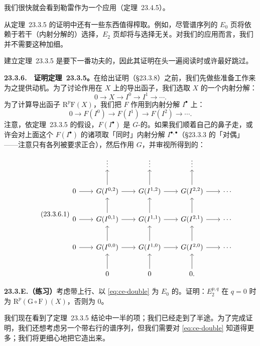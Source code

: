 我们很快就会看到勒雷\trSpectralSequence{}作为一个应用（\mbox{定理~23.4.5}）。

从\mbox{定理~23.3.5} 的证明中还有一些东西值得榨取。例如，尽管谱序列的 $E_0$ 页将依赖于若干（内射分解的）选择，$E_2$ 页却将与选择无关。对我们的应用而言，我们并不需要这种加细。

建立\mbox{定理~23.3.5} 是要下一番功夫的，因此其证明在头一遍阅读时或许最好跳过。

\textbf{23.3.6.}\ \hard\ \textbf{证明\mbox{定理~23.3.5}。}\quad 在给出证明（\S23.3.8）之前，我们先做些准备工作来为之提供动机。为了讨论作用在 $X$ 上的导出函子，我们选取 $X$ 的一个内射分解：
\[
0 \longrightarrow X \longrightarrow I^0 \longrightarrow I^1 \longrightarrow \cdots.
\]
为了计算导出函子 $\mathrm{R}^p\mathrm{F}(X)$，我们把 $F$ 作用到内射分解 $I^\bullet$ 上：
\[
0 \longrightarrow F(I^0) \longrightarrow F(I^1) \longrightarrow F(I^2) \longrightarrow \cdots.
\]
注意，依\mbox{定理~23.3.5} 的假设，$F(I^\bullet)$ 是 $G$-\trAcyclic{}的。如果我们顺着自己的鼻子走，或许会对上面这个\trComplexN{} $F(I^\bullet)$ 的诸项取「同时」内射分解 $I^{\bullet,\bullet}$（\S23.3.3 的「对偶」——注意只有各列被要求正合），然后作用 $G$，并审视所得到的\trDoubleComplex：
\begin{equation*}\tag{23.3.6.1}\label{eq:ce-double}
\begin{tikzcd}[row sep=2.2em, column sep=2em]
 & \vdots & \vdots & \vdots & \\
0 \ar[r] & G(I^{0,2}) \ar[r] \ar[u] & G(I^{1,2}) \ar[r] \ar[u] & G(I^{2,2}) \ar[r] \ar[u] & \cdots \\
0 \ar[r] & G(I^{0,1}) \ar[r] \ar[u] & G(I^{1,1}) \ar[r] \ar[u] & G(I^{2,1}) \ar[r] \ar[u] & \cdots \\
0 \ar[r] & G(I^{0,0}) \ar[r] \ar[u] & G(I^{1,0}) \ar[r] \ar[u] & G(I^{2,0}) \ar[r] \ar[u] & \cdots \\
 & 0 \ar[u] & 0 \ar[u] & 0. \ar[u] &
\end{tikzcd}
\end{equation*}

\textbf{23.3.E.（练习）}\quad 考虑带上行\trOrientation{}、以 \eqref{eq:ce-double} 为 $E_0$ \trPage{}的\trSpectralSequence。证明：$E_2^{p,q}$ 在 $q=0$ 时为 $\mathrm{R}^p(\mathrm{G}\circ\mathrm{F})(X)$，否则为 $0$。

我们现在看到了\mbox{定理~23.3.5} 结论中一半的项；我们已经走到了半途。为了完成证明，我们还想考虑另一个带右行\trOrientation{}的谱序列，但我们需要对 \eqref{eq:ce-double} 知道得更多；我们将更细心地把它造出来。

